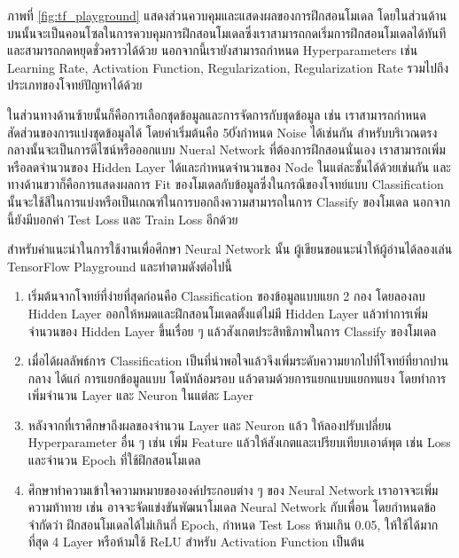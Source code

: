 ภาพที่ \ref{fig:tf_playground} แสดงส่วนควบคุมและแสดงผลของการฝึกสอนโมเดล โดยในส่วนด้านบนนั้นจะเป็นคอนโซลในการควบคุมการฝึกสอนโมเดลซึ่งเราสามารถกดเริ่มการฝึกสอนโมเดลได้ทันที และสามารถกดหยุดชั่วคราวได้ด้วย นอกจากนี้เรายังสามารถกำหนด Hyperparameters เช่น Learning Rate, Activation Function, Regularization, Regularization Rate รวมไปถึงประเภทของโจทย์ปัญหาได้ด้วย

ในส่วนทางด้านซ้ายนั้นก็คือการเลือกชุดข้อมูลและการจัดการกับชุดข้อมูล เช่น เราสามารถกำหนดสัดส่วนของการแบ่งชุดข้อมูลได้ โดยค่าเริ่มต้นคือ 50ังกำหนด Noise ได้เช่นกัน สำหรับบริเวณตรงกลางนั้นจะเป็นการดีไซน์หรือออกแบบ Nueral Network ที่ต้องการฝึกสอนนั่นเอง เราสามารถเพิ่มหรือลดจำนวนของ Hidden Layer ได้และกำหนดจำนวนของ Node ในแต่ละชั้นได้ด้วยเช่นกัน และทางด้านขวาก็คือการแสดงผลการ Fit ของโมเดลกับข้อมูลซึ่งในกรณีของโจทย์แบบ Classification นั้นจะใช้สีในการแบ่งหรือเป็นเกณฑ์ในการบอกถึงความสามารถในการ Classify ของโมเดล นอกจากนี้ยังมีบอกค่า Test Loss และ Train Loss อีกด้วย

สำหรับคำแนะนำในการใช้งานเพื่อศึกษา Neural Network นั้น ผู้เขียนขอแนะนำให้ผู้อ่านได้ลองเล่น TensorFlow Playground และทำตามดังต่อไปนี้

\begin{enumerate}
    \item เริ่มต้นจากโจทย์ที่ง่ายที่สุดก่อนคือ Classification ของข้อมูลแบบแยก 2 กอง โดยลองลบ Hidden Layer ออกให้หมดและฝึกสอนโมเดลตั้งแต่ไม่มี Hidden Layer แล้วทำการเพิ่มจำนวนของ Hidden Layer ขึ้นเรื่อย ๆ แล้วสังเกตประสิทธิภาพในการ Classify ของโมเดล
    
    \item เมื่อได้ผลลัพธ์การ Classification เป็นที่น่าพอใจแล้วจึงเพิ่มระดับความยากไปที่โจทย์ที่ยากปานกลาง ได้แก่ การแยกข้อมูลแบบ โดนัทล้อมรอบ แล้วตามด้วยการแยกแบบแยกทแยง โดยทำการเพิ่มจำนวน Layer และ Neuron ในแต่ละ Layer 
    
    \item หลังจากที่เราศึกษาถึงผลของจำนวน Layer และ Neuron แล้ว ให้ลองปรับเปลี่ยน Hyperparameter อื่น ๆ เช่น เพิ่ม Feature แล้วให้สังเกตและเปรียบเทียบเอาต์พุต เช่น Loss และจำนวน Epoch ที่ใช้ฝึกสอนโมเดล
    
    \item ศึกษาทำความเข้าใจความหมายขององค์ประกอบต่าง ๆ ของ Neural Network เราอาจจะเพิ่มความท้าทาย เช่น อาจจะจัดแข่งขันพัฒนาโมเดล Neural Network กับเพื่อน โดยกำหนดข้อจำกัดว่า ฝึกสอนโมเดลได้ไม่เกินกี่ Epoch, กำหนด Test Loss ห้ามเกิน 0.05, ให้ใช้ได้มากที่สุด 4 Layer หรือห้ามใช้ ReLU สำหรับ Activation Function เป็นต้น
\end{enumerate}

